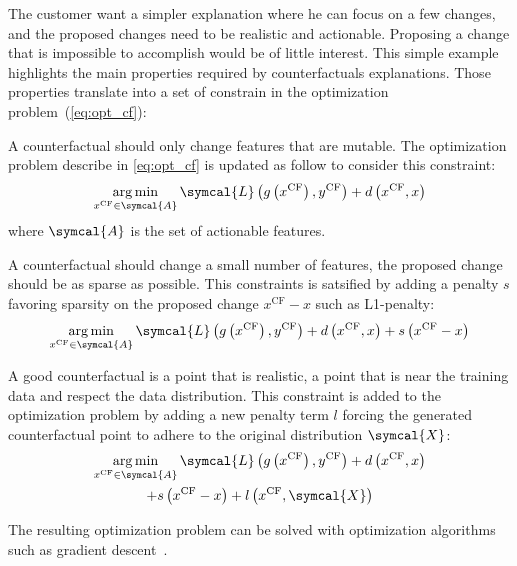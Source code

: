 \documentclass[../main.tex]{subfiles}
\begin{document}
	The customer want a simpler explanation where he can focus on a few changes, and the proposed changes need to be realistic and actionable. 
	Proposing a change that is impossible to accomplish would be of little interest. 
	This simple example highlights the main properties required by counterfactuals explanations.
	Those properties translate into a set of constrain in the optimization problem~(\cref{eq:opt_cf}):
	\begin{description}[
		style=multiline,
		leftmargin=!,
		labelwidth=3cm,
	]
		\item[Actionnability] 
		A counterfactual should only change features that are mutable. 
		The optimization problem describe in \cref{eq:opt_cf} is updated as follow to consider this constraint:
		\[\argmin_{x^{\text{CF}} \in \symcal{A}} \symcal{L}\left(g\left(x^{\text{CF}}\right), y^{\text{CF}} \right) + d\left(x^{\text{CF}}, x\right)\]
		where \(\symcal{A}\) is the set of actionable features.
		\item[Sparsity\label{item:cf_sparse}]
		A counterfactual should change a small number of features, \ie{}the proposed change should be as sparse as possible.
		This constraints is satsified by adding a penalty \(s\) favoring sparsity on the proposed change \(x^{\text{CF}} - x\) such as L1-penalty:
		\begin{equation*} 
			\argmin_{x^{\text{CF}} \in \symcal{A}} \symcal{L}\left(g\left(x^{\text{CF}}\right), y^{\text{CF}} \right) + d\left(x^{\text{CF}}, x\right) + s\left(x^{\text{CF}}-x\right)
			\end{equation*}
		\item[Data manifold closeness\label{item:cf_data_manifold}]  
		A good counterfactual is a point that is realistic, a point that is near the training data and respect the data distribution. 
		This constraint is added to the optimization problem by adding a new penalty term \(l\) forcing the generated counterfactual point to adhere to the original distribution \(\symcal{X}\):
		\begin{multline*} 
		\argmin_{x^{\text{CF}} \in \symcal{A}} \symcal{L}\left(g\left(x^{\text{CF}}\right), y^{\text{CF}} \right) + d\left(x^{\text{CF}}, x\right)\\ + s\left(x^{\text{CF}}-x\right) + l\left(x^{\text{CF}}, \symcal{X}\right)
		\end{multline*}
	\end{description}
	The resulting optimization problem can be solved with optimization algorithms such as gradient descent~\cite{wachter2017counterfactual}. 
\end{document}
